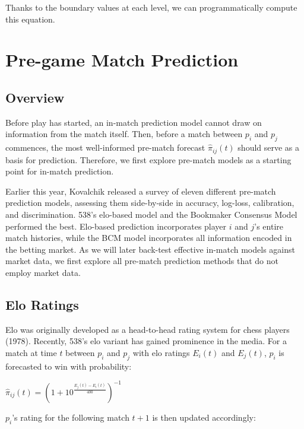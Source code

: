 \documentclass[chapterprefix=false]{report}
\begin{document}
Thanks to the boundary values at each level, we can programmatically compute this equation.

\chapter{Pre-game Match Prediction}

\section{Overview}
Before play has started, an in-match prediction model cannot draw on information from the match itself. Then, before a match between $p_i$ and $p_j$ commences, the most well-informed pre-match forecast $\hat{\pi}_{ij}(t)$ should serve as a basis for prediction. Therefore, we first explore pre-match models as a starting point for in-match prediction.

Earlier this year, Kovalchik released a survey of eleven different pre-match prediction models, assessing them side-by-side in accuracy, log-loss, calibration, and discrimination. 538's elo-based model and the Bookmaker Consensus Model performed the best. Elo-based prediction incorporates player $i$ and $j$'s entire match histories, while the BCM model incorporates all information encoded in the betting market. As we will later back-test effective in-match models against market data, we first explore all pre-match prediction methods that do not employ market data.


\section{Elo Ratings}
Elo was originally developed as a head-to-head rating system for chess players (1978). Recently, 538's elo variant has gained prominence in the media. For a match at time $t$ between $p_i$ and $p_j$ with elo ratings $E_i(t)$ and $E_j(t)$, $p_i$ is forecasted to win with probability:

\begin{center}
$\hat{\pi}_{ij}(t) = (1 + 10^\frac{E_j(t)-E_i(t)}{400})^{-1}$
\end{center}

$p_i$'s rating for the following match $t+1$ is then updated accordingly:
\end{document}
